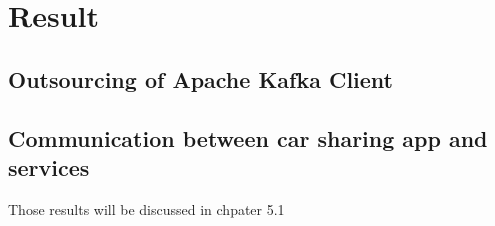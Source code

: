 
\chapter{Result}

\section{Outsourcing of Apache Kafka Client}

\section{Communication between car sharing app and services}

Those results will be discussed in chpater 5.1